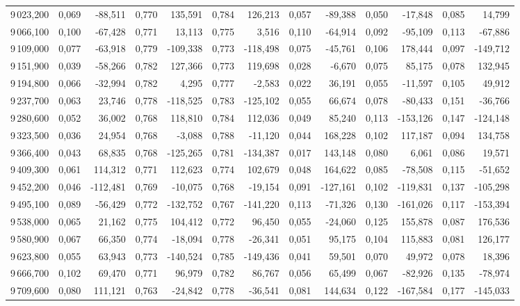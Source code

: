 \begin{longtable}{rrrrrrrrrrrrr}
9\,023,200 & 0,069 & -88,511 & 0,770 & 135,591 & 0,784 & 126,213 & 0,057 & -89,388 & 0,050 & -17,848 & 0,085 & 14,799\\
9\,066,100 & 0,100 & -67,428 & 0,771 & 13,113 & 0,775 & 3,516 & 0,110 & -64,914 & 0,092 & -95,109 & 0,113 & -67,886\\
9\,109,000 & 0,077 & -63,918 & 0,779 & -109,338 & 0,773 & -118,498 & 0,075 & -45,761 & 0,106 & 178,444 & 0,097 & -149,712\\
9\,151,900 & 0,039 & -58,266 & 0,782 & 127,366 & 0,773 & 119,698 & 0,028 & -6,670 & 0,075 & 85,175 & 0,078 & 132,945\\
9\,194,800 & 0,066 & -32,994 & 0,782 & 4,295 & 0,777 & -2,583 & 0,022 & 36,191 & 0,055 & -11,597 & 0,105 & 49,912\\
9\,237,700 & 0,063 & 23,746 & 0,778 & -118,525 & 0,783 & -125,102 & 0,055 & 66,674 & 0,078 & -80,433 & 0,151 & -36,766\\
9\,280,600 & 0,052 & 36,002 & 0,768 & 118,810 & 0,784 & 112,036 & 0,049 & 85,240 & 0,113 & -153,126 & 0,147 & -124,148\\
9\,323,500 & 0,036 & 24,954 & 0,768 & -3,088 & 0,788 & -11,120 & 0,044 & 168,228 & 0,102 & 117,187 & 0,094 & 134,758\\
9\,366,400 & 0,043 & 68,835 & 0,768 & -125,265 & 0,781 & -134,387 & 0,017 & 143,148 & 0,080 & 6,061 & 0,086 & 19,571\\
9\,409,300 & 0,061 & 114,312 & 0,771 & 112,623 & 0,774 & 102,679 & 0,048 & 164,622 & 0,085 & -78,508 & 0,115 & -51,652\\
9\,452,200 & 0,046 & -112,481 & 0,769 & -10,075 & 0,768 & -19,154 & 0,091 & -127,161 & 0,102 & -119,831 & 0,137 & -105,298\\
9\,495,100 & 0,089 & -56,429 & 0,772 & -132,752 & 0,767 & -141,220 & 0,113 & -71,326 & 0,130 & -161,026 & 0,117 & -153,394\\
9\,538,000 & 0,065 & 21,162 & 0,775 & 104,412 & 0,772 & 96,450 & 0,055 & -24,060 & 0,125 & 155,878 & 0,087 & 176,536\\
9\,580,900 & 0,067 & 66,350 & 0,774 & -18,094 & 0,778 & -26,341 & 0,051 & 95,175 & 0,104 & 115,883 & 0,081 & 126,177\\
9\,623,800 & 0,055 & 63,943 & 0,773 & -140,524 & 0,785 & -149,436 & 0,041 & 59,501 & 0,070 & 49,972 & 0,078 & 18,396\\
9\,666,700 & 0,102 & 69,470 & 0,771 & 96,979 & 0,782 & 86,767 & 0,056 & 65,499 & 0,067 & -82,926 & 0,135 & -78,974\\
9\,709,600 & 0,080 & 111,121 & 0,763 & -24,842 & 0,778 & -36,541 & 0,081 & 144,634 & 0,122 & -167,584 & 0,177 & -145,033\\

\end{longtable}

